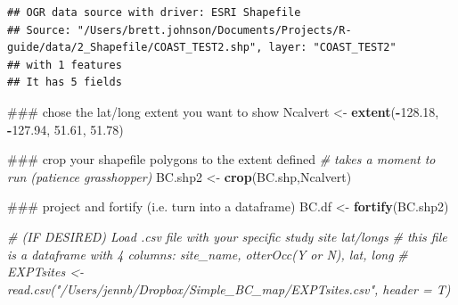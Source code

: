 \documentclass[]{book}
\newenvironment{Shaded}{\begin{snugshade}}{\end{snugshade}}
\newcommand{\KeywordTok}[1]{\textcolor[rgb]{0.13,0.29,0.53}{\textbf{#1}}}
\newcommand{\FloatTok}[1]{\textcolor[rgb]{0.00,0.00,0.81}{#1}}
\newcommand{\StringTok}[1]{\textcolor[rgb]{0.31,0.60,0.02}{#1}}
\newcommand{\CommentTok}[1]{\textcolor[rgb]{0.56,0.35,0.01}{\textit{#1}}}
\newcommand{\OperatorTok}[1]{\textcolor[rgb]{0.81,0.36,0.00}{\textbf{#1}}}
\newcommand{\NormalTok}[1]{#1}
\begin{document}
\begin{verbatim}
## OGR data source with driver: ESRI Shapefile 
## Source: "/Users/brett.johnson/Documents/Projects/R-guide/data/2_Shapefile/COAST_TEST2.shp", layer: "COAST_TEST2"
## with 1 features
## It has 5 fields
\end{verbatim}

\begin{Shaded}
\begin{Highlighting}[]
\NormalTok{### chose the lat/long extent you want to show}
\NormalTok{Ncalvert <-}\StringTok{ }\KeywordTok{extent}\NormalTok{(}\OperatorTok{-}\FloatTok{128.18}\NormalTok{, }\OperatorTok{-}\FloatTok{127.94}\NormalTok{, }\FloatTok{51.61}\NormalTok{, }\FloatTok{51.78}\NormalTok{)}

\NormalTok{### crop your shapefile polygons to the extent defined}
\CommentTok{# takes a moment to run (patience grasshopper)}
\NormalTok{BC.shp2 <-}\StringTok{ }\KeywordTok{crop}\NormalTok{(BC.shp,Ncalvert)}

\NormalTok{### project and fortify (i.e. turn into a dataframe)}
\NormalTok{BC.df <-}\StringTok{ }\KeywordTok{fortify}\NormalTok{(BC.shp2)}

\CommentTok{# (IF DESIRED) Load .csv file with your specific study site lat/longs}
\CommentTok{# this file is a dataframe with 4 columns: site_name, otterOcc(Y or N), lat, long  }
\CommentTok{# EXPTsites <- read.csv("/Users/jennb/Dropbox/Simple_BC_map/EXPTsites.csv", header = T)}


\end{Highlighting}
\end{Shaded}
\end{document}
